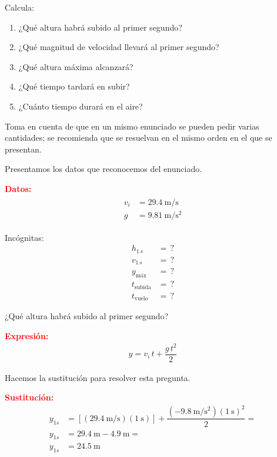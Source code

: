 \documentclass[14pt]{extarticle}
\newcommand{\textocolor}[2]{\textbf{\textcolor{#1}{#2}}}
\begin{document}
\vspace*{0.5cm}
Calcula:
\begin{enumerate}
\item ¿Qué altura habrá subido al primer segundo?
\item ¿Qué magnitud de velocidad llevará al primer segundo?
\item ¿Qué altura máxima alcanzará?
\item ¿Qué tiempo tardará en subir?
\item ¿Cuánto tiempo durará en el aire?
\end{enumerate}
Toma en cuenta de que en un mismo enunciado se pueden pedir varias cantidades; se recomienda que se resuelvan en el mismo orden en el que se presentan.

Presentamos los datos que reconocemos del enunciado.

\vspace*{0.5cm}
\begin{minipage}[t]{0.4\linewidth}
\textocolor{red}{Datos:}
\begin{eqnarray*}
\begin{aligned}
v_{i} &= \SI{29.4}{\meter\per\second} \\
g &= \SI{9.81}{\meter\per\square\second}
\end{aligned}
\end{eqnarray*}
\end{minipage}
\hspace{1cm}
\begin{minipage}[t]{0.4\linewidth}
Incógnitas:
\begin{align*}
h_{1 \, s} &= \, ? \\
v_{1 \, s} &= \, ? \\
y_{\text{máx}} &= \, ? \\
t_{\text{subida}} &= \, ? \\ 
t_{\text{vuelo}} &= \, ?
\end{align*}
\end{minipage}

\vspace*{0.5cm}

\noindent
¿Qué altura habrá subido al primer segundo?

\textocolor{red}{Expresión:}
\begin{align*}
y = v_{i} \, t + \dfrac{g \, t^{2}}{2}
\end{align*}

Hacemos la sustitución para resolver esta pregunta.

\vspace*{0.5cm}
\textocolor{red}{Sustitución:}
\begin{align*}
y_{1 s} &= \left[ \left( \SI[per-mode=fraction]{29.4}{\meter\per\second} \right) (\SI{1}{\second}) \right] + \dfrac{\displaystyle \left( - \SI[per-mode=fraction]{9.8}{\meter\per\square\second} \right)(\SI{1}{\second})^{2}}{2} = \\[0.5em] 
y_{1 s} &= \SI{29.4}{\meter} - \SI[per-mode=fraction]{4.9}{\meter} = \\[0.5em] 
y_{1 s} &= \SI{24.5}{\meter}
\end{align*}
\end{document}

